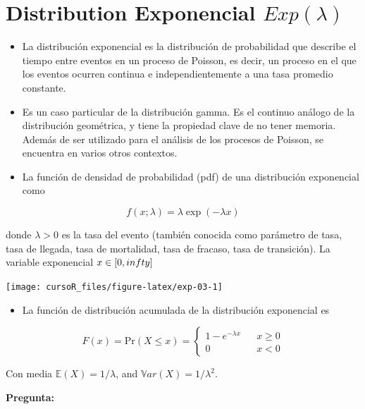 \documentclass[]{book}
\providecommand{\tightlist}{%
  \setlength{\itemsep}{0pt}\setlength{\parskip}{0pt}}
\begin{document}
\section{\texorpdfstring{Distribution Exponencial
\(Exp(\lambda)\)}{Distribution Exponencial Exp(\textbackslash{}lambda)}}\label{distribution-exponencial-explambda}

\begin{itemize}
\item
  La distribución exponencial es la distribución de probabilidad que
  describe el tiempo entre eventos en un proceso de Poisson, es decir,
  un proceso en el que los eventos ocurren continua e independientemente
  a una tasa promedio constante.
\item
  Es un caso particular de la distribución gamma. Es el continuo análogo
  de la distribución geométrica, y tiene la propiedad clave de no tener
  memoria. Además de ser utilizado para el análisis de los procesos de
  Poisson, se encuentra en varios otros contextos.
\item
  La función de densidad de probabilidad (pdf) de una distribución
  exponencial como
\end{itemize}

\[
f(x;\lambda) =  \lambda \exp(-\lambda x)
\]

donde \(\lambda>0\) es la tasa del evento (también conocida como
parámetro de tasa, tasa de llegada, tasa de mortalidad, tasa de fracaso,
tasa de transición). La variable exponencial \(x \in[0,\\infty]\)

\begin{center}\texttt{[image: cursoR\_files/figure-latex/exp-03-1]} \end{center}

\begin{itemize}
\tightlist
\item
  La función de distribución acumulada de la distribución exponencial es
\end{itemize}

\[
F(x) = \mbox{Pr}(X\leq x) = 
  \left\{
    \begin{array}{lcc}
      1- e^{-\lambda x} & & x\geq 0 \\
      0                 & & x < 0
    \end{array}
  \right.
\]

Con media \(\mathbb{E}(X) = 1/\lambda\), and
\(\mathbb{V}ar(X) = 1/\lambda^2\).

\textbf{Pregunta:}
\end{document}

